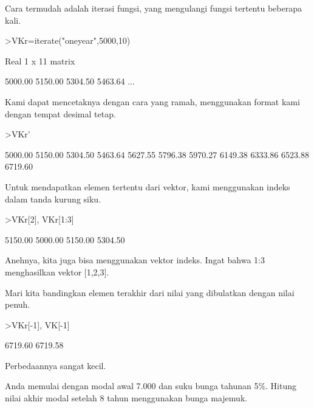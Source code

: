 \documentclass{article}
\begin{document}
\begin{eulernotebook}
\begin{eulercomment}
\begin{eulercomment}
\begin{eulercomment}
\begin{eulercomment}
\begin{eulercomment}
Cara termudah adalah iterasi fungsi, yang mengulangi fungsi tertentu
beberapa kali.
\end{eulercomment}
\begin{eulerprompt}
>VKr=iterate("oneyear",5000,10)
\end{eulerprompt}
\begin{euleroutput}
  Real 1 x 11 matrix
  
      5000.00     5150.00     5304.50     5463.64     ...
\end{euleroutput}
\begin{eulercomment}
Kami dapat mencetaknya dengan cara yang ramah, menggunakan format kami
dengan tempat desimal tetap.
\end{eulercomment}
\begin{eulerprompt}
>VKr'
\end{eulerprompt}
\begin{euleroutput}
      5000.00 
      5150.00 
      5304.50 
      5463.64 
      5627.55 
      5796.38 
      5970.27 
      6149.38 
      6333.86 
      6523.88 
      6719.60 
\end{euleroutput}
\begin{eulercomment}
Untuk mendapatkan elemen tertentu dari vektor, kami menggunakan indeks
dalam tanda kurung siku.
\end{eulercomment}
\begin{eulerprompt}
>VKr[2], VKr[1:3]
\end{eulerprompt}
\begin{euleroutput}
      5150.00 
      5000.00     5150.00     5304.50 
\end{euleroutput}
\begin{eulercomment}
Anehnya, kita juga bisa menggunakan vektor indeks. Ingat bahwa 1:3
menghasilkan vektor [1,2,3].

Mari kita bandingkan elemen terakhir dari nilai yang dibulatkan dengan
nilai penuh.
\end{eulercomment}
\begin{eulerprompt}
>VKr[-1], VK[-1]
\end{eulerprompt}
\begin{euleroutput}
      6719.60 
      6719.58 
\end{euleroutput}
\begin{eulercomment}
Perbedaannya sangat kecil.\\
\end{eulercomment}
\eulersubheading{}
\begin{eulercomment}
Anda memulai dengan modal awal \textdollar{}7.000 dan suku bunga tahunan 5\%.
Hitung nilai akhir modal setelah 8 tahun menggunakan bunga majemuk.


\end{eulercomment}
\end{eulercomment}
\end{eulercomment}
\end{eulercomment}
\end{eulercomment}
\end{eulernotebook}
\end{document}
